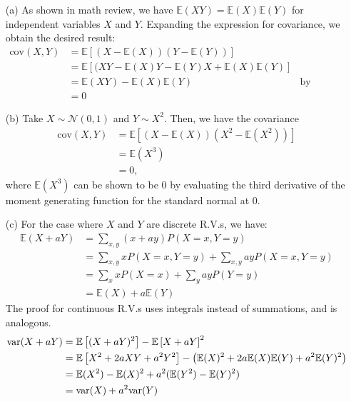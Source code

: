 \documentclass[submit]{harvardml}
\newcommand{\E}{\mathbb{E}}
\newcommand{\cov}{\text{cov}}
\begin{document}
\begin{enumerate}
	\item[(a)] As shown in math review, we have $\E(XY) = \E(X)\E(Y)$ for independent variables $X$ and $Y$. Expanding the expression for covariance, we obtain the desired result:
	\begin{align*}
	\cov (X, Y) &= \E\left[(X - \E(X)) (Y - \E(Y))\right] \\
	&= \E\left[(XY - \E(X)Y - \E(Y)X + \E(X)\E(Y)\right] \\
	&= \E(XY) - \E(X)\E(Y) & \text{by linearity of expectation} \\
	&= 0
	\end{align*}
	
	\item[(b)] Take $X\sim\mathcal{N}(0, 1)$ and $Y\sim X^2$. Then, we have the covariance
	\begin{align*}
	\cov(X, Y) &= \E\left[(X - \E(X)) (X^2 - \E(X^2))\right] \\
	&= \E(X^3) \\
	&= 0,
	\end{align*}
	where $\E(X^3)$ can be shown to be 0 by evaluating the third derivative of the moment generating function for the standard normal at 0.
	
	\item[(c)] For the case where $X$ and $Y$ are discrete R.V.s, we have:
	\begin{align*}
	\E(X + aY) &= \sum_{x, y} (x + ay) P(X = x, Y = y) \\
	&= \sum_{x, y} x P(X = x, Y = y) + \sum_{x, y} ay P(X = x, Y = y) \\
	&= \sum_{x} x P(X = x) + \sum_{y} ay P(Y = y) \\
	&= \E(X) + a\E(Y)
	\end{align*}
	The proof for continuous R.V.s uses integrals instead of summations, and is analogous.
	\begin{align*}
	\var(X + aY) &= \E\left[(X + aY)^2\right] - \E\left[X + aY\right]^2 \\
	&= \E\left[X^2 + 2aXY + a^2Y^2\right] - \left(\E(X)^2 + 2a\E(X)\E(Y) + a^2\E(Y)^2\right) \\
	&= \E(X^2) - \E(X)^2 + a^2(\E(Y^2) - \E(Y)^2) \\
	&= \var(X) + a^2\var(Y)
	\end{align*}
	
\end{enumerate}


\newpage
\end{document}
